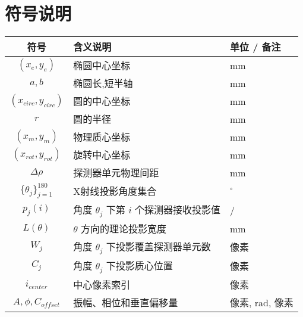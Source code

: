 \section{符号说明}
\begin{table}[htbp]
    \centering
    \begin{tabular}{c l l}
        \toprule
        \textbf{符号} & \textbf{含义说明} & \textbf{单位 / 备注} \\
        \hline
        $(x_e, y_e)$ & 椭圆中心坐标 & mm \\
        $a, b$ & 椭圆长,短半轴 & mm \\
        $(x_{circ}, y_{circ})$ & 圆的中心坐标 & mm \\
        $r$ & 圆的半径 & mm \\
        $(x_m, y_m)$ & 物理质心坐标 & mm \\
        $(x_{rot}, y_{rot})$ & 旋转中心坐标 & mm \\
        $\Delta\rho$ & 探测器单元物理间距 & mm \\
        $\{\theta_j\}_{j=1}^{180}$ & X射线投影角度集合 & $^{\circ}$ \\
        $p_j(i)$ & 角度 $\theta_j$ 下第 $i$ 个探测器接收投影值 & / \\
        $L(\theta)$ &  $\theta$ 方向的理论投影宽度 & mm \\
        $W_j$ & 角度 $\theta_j$ 下投影覆盖探测器单元数 & 像素 \\
        $C_j$ & 角度 $\theta_j$ 下投影质心位置 & 像素 \\
        $i_{center}$ & 中心像素索引 & 像素\\
        $A, \phi, C_{offset}$ & 振幅、相位和垂直偏移量 & 像素, rad, 像素 \\
        \bottomrule
    \end{tabular}
\end{table}
